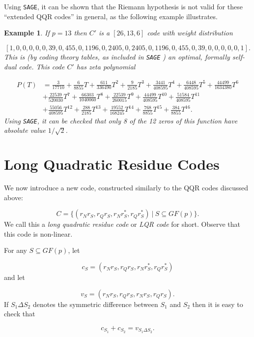 \documentclass[submission%
]{dmtcs}
\newtheorem{example}{Example}
\begin{document}
Using {\tt SAGE}, it can be shown that the Riemann hypothesis is not valid 
for these ``extended QQR codes'' in general, as the 
following example illustrates.

\begin{example}
If $p=13$ then $C'$ is a $[26,13,6]$ code with
weight distribution

\[
[1, 0, 0, 0, 0, 0, 39,
 0, 455, 0, 1196, 0, 2405,
 0, 2405, 0, 1196, 0, 455,
 0, 39, 0, 0, 0, 0, 0, 1].
\]
This is (by coding theory tables, as included in {\tt SAGE}
\cite{S}) an optimal, formally self-dual code.
This code $C'$ has zeta polynomial

\[
\begin{array}{ll}
P(T)&= \frac{3}{17710} + \frac{6}{8855}T + \frac{611}{336490}T^2 + 
\frac{9}{2185}T^3 + \frac{3441}{408595}T^4 + 
\frac{6448}{408595}T^5 + \frac{44499}{1634380}T^6  \\
&+
\frac{22539}{520030}T^7 + \frac{66303}{1040060}T^8 + 
\frac{22539}{260015}T^9 + \frac{44499}{408595}T^{10} + 
\frac{51584}{408595}T^{11}  \\
& +\frac{55056}{408595}T^{12} + 
\frac{288}{2185}T^{13} + \frac{19552}{168245}T^{14} + 
\frac{768}{8855}T^{15} + \frac{384}{8855}T^{16}.
\end{array}
\]
Using {\tt SAGE}, it can be checked that 
only 8 of the 12 zeros of this function
have absolute value $1/\sqrt{2}$.
\end{example}

\section{Long Quadratic Residue Codes}
\label{sec:lqrc}
\label{sec:LQR}

We now introduce a new code, constructed similarly to the
QQR codes discussed above:

\[
C=\lbrace ({r}_N r_S, {r}_Q r_S, {r}_N r_S^*, {r}_Q r_S^*)\ |\
S\subseteq GF(p)\rbrace .
\]
We call this a {\it long quadratic residue code} or
{\it LQR code} for short.
Observe that this code is non-linear.

For any $S\subseteq GF(p)$, let

\[
c_S=({r}_N r_S, {r}_Q r_S, {r}_N r_S^*, {r}_Q r_S^*)
\]
and let

\[
v_S=({r}_N r_S, {r}_Q r_S, {r}_N r_{S}, {r}_Q r_{S}).
\]
If $S_1\Delta S_2$ denotes the symmetric difference between
$S_1$ and $S_2$ then it is easy to check that

\begin{equation}
\label{eqn:add}
c_{S_1}+c_{S_2}=v_{S_1\Delta S_2}.
\end{equation}
\end{document}
